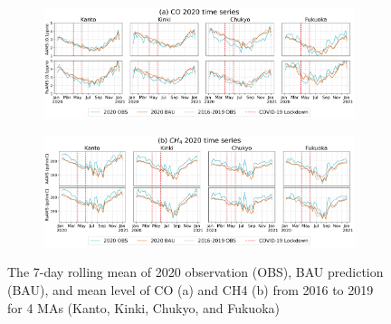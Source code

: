 \begin{figure}[tbh!]
    \centering
    \begin{subfigure}{\textwidth}
      \centering
      \includegraphics[width=\textwidth]{figs/chap4/fig8a.png}
      \label{fig:chap4_fig8a}
    \end{subfigure}

    \begin{subfigure}{\textwidth}
      \centering
      \includegraphics[width=\textwidth]{figs/chap4/fig8b.png}
      \label{fig:chap4_fig8b}
    \end{subfigure}
    \caption[2020 CO and CH4 mean trends (4 MAs)]{The 7-day rolling mean of 2020 observation (OBS), BAU prediction (BAU), and mean level of CO (a) and CH4 (b) from 2016 to 2019 for 4 MAs (Kanto, Kinki, Chukyo, and Fukuoka)}
    \label{fig:chap4_fig8}
\end{figure}


